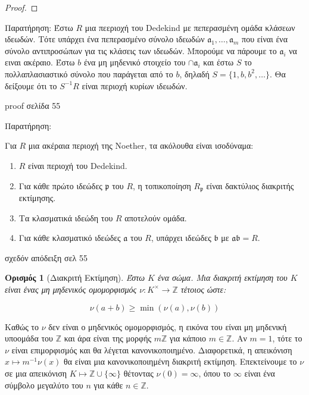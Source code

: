\documentclass[oneside,a4paper]{article}
\newtheorem*{defn}{Ορισμός}
\newcommand {\tl}{\textlatin}
\newcommand{\Z}{\mathbb{Z}}
\begin{document}
\begin{proof}
\end{proof}


Παρατήρηση:
Έστω $R$ μια πεεριοχή του \tl{Dedekind} με πεπερασμένη ομάδα κλάσεων ιδεωδών. Τότε υπάρχει ένα πεπερασμένο σύνολο ιδεωδών $\mathfrak{a}_1,\ldots,\mathfrak{a}_m$ που είναι ένα σύνολο αντιπροσώπων για τις κλάσεις των ιδεωδών. Μπορούμε να πάρουμε το $\mathfrak{a}_i$ να ειναι ακέραιο. Έστω $b$ ένα μη μηδενικό στοιχείο του $\cap \mathfrak{a}_i$ και έστω $S$ το πολλαπλασιαστικό σύνολο που παράγεται από το $b$, δηλαδή $S=\{1,b,b^2,\ldots\}$. Θα δείξουμε ότι το $S^{-1} R$ είναι περιοχή κυρίων ιδεωδών.

\tl{proof} σελίδα 55


Παρατήρηση:

Για $R$ μια ακέραια περιοχή της \tl{Noether}, τα ακόλουθα είναι ισοδύναμα:

\begin{enumerate}
	\item $R$ είναι περιοχή του \tl{Dedekind}.
	\item Για κάθε πρώτο ιδεώδες $\mathfrak{p}$ του $R$, η τοπικοποίηση $R_{\mathfrak{p}}$ είναι δακτύλιος διακριτής εκτίμησης.
	\item Τα κλασματικά ιδεώδη του $R$ αποτελούν ομάδα.
	\item Για κάθε κλασματικό ιδεώδες $\mathfrak{a}$ του $R$, υπάρχει ιδεώδες $\mathfrak{b}$ με $\mathfrak{a}\mathfrak{b} = R$.
\end{enumerate}

σχεδόν απόδειξη σελ 55

\pagebreak

\begin{defn}[Διακριτή Εκτίμηση]
	Έστω $K$ ένα σώμα. Μια διακριτή εκτίμηση του $K$ είναι ένας μη μηδενικός ομομορφισμός $\nu : K^{\times} \rightarrow \Z$ τέτοιος ώστε:
	
	$$\nu(a+b) \geq \min (\nu(a),\nu(b))$$ 
	
\end{defn}

Καθώς το $\nu$ δεν είναι ο μηδενικός ομομορφισμός, η εικόνα του είναι μη μηδενική υποομάδα του $\Z$ και άρα είναι της μορφής $m\Z$ για κάποιο $m \in \Z$. Αν $m=1$, τότε το $\nu$ είναι επιμορφισμός και θα λέγεται κανονικοποιημένο. Διαφορετικά, η απεικόνιση $x \mapsto m^{-1}\nu(x)$ θα είναι μια κανονικοποιημένη διακριτή εκτίμηση. Επεκτείνουμε το $\nu$ σε μια απεικόνιση $K\mapsto \Z \cup \{\infty \}$ θέτοντας $\nu(0) = \infty$, όπου το $\infty$ είναι ένα σύμβολο μεγαλύτο του $n$ για κάθε $n \in \Z$. 
\end{document}
